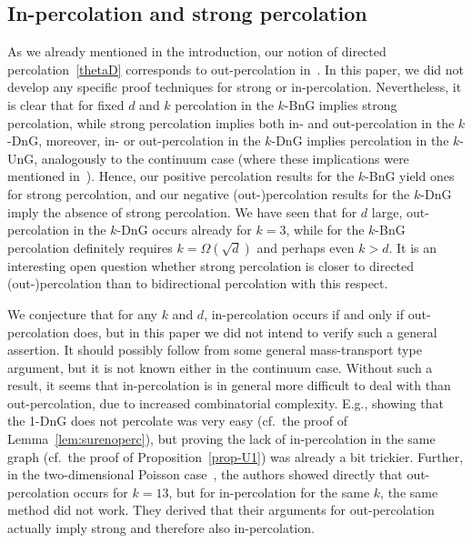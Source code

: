 \documentclass[oneside]{amsart}
\theoremstyle{definition}
\newcommand{\1}{\mathbbm{1}}
\newcommand{\0}{\mathbf{o}}
\numberwithin{equation}{section}
\begin{document}
\subsection{In-percolation and strong percolation}\label{sec-instrong}
As we already mentioned in the introduction, our notion of directed percolation~\eqref{thetaD} corresponds to out-percolation in~\cite{BalisterBollobas13}. In this paper, we did not develop any specific proof techniques for strong or in-percolation. Nevertheless, it is clear that for fixed $d$ and $k$ percolation in the $k$-BnG implies strong percolation, while strong percolation implies both in- and out-percolation in the $k$-DnG, moreover, in- or out-percolation in the $k$-DnG implies percolation in the $k$-UnG, analogously to the continuum case (where these implications were mentioned in~\cite{BalisterBollobas13}). Hence, our positive percolation results for the $k$-BnG yield ones for strong percolation, and our negative (out-)percolation results for the $k$-DnG imply the absence of strong percolation. We have seen that for $d$ large, out-percolation in the $k$-DnG occurs already for $k=3$, while for the $k$-BnG percolation definitely requires $k=\Omega(\sqrt d)$ and perhaps even $k>d$. It is an interesting open question whether strong percolation is closer to directed (out-)percolation than to bidirectional percolation with this respect.

We conjecture that for any $k$ and $d$, in-percolation occurs if and only if out-percolation does, but in this paper we did not intend to verify such a general assertion. It should possibly follow from some general mass-transport type argument, but it is not known either in the continuum case. Without such a result, it seems that in-percolation is in general more difficult to deal with than out-percolation, due to increased combinatorial complexity. E.g., showing that the 1-DnG does not percolate was very easy (cf.\ the proof of Lemma~\ref{lem:surenoperc}), but proving the lack of in-percolation in the same graph (cf.\ the proof of Proposition~\ref{prop-U1}) was already a bit trickier. Further, in the two-dimensional Poisson case~\cite[Proof of Theorem 2]{BalisterBollobas13}, the authors showed directly that 
out-percolation occurs for $k=13$, but for in-percolation for the same $k$, the same method did not work. They derived that their arguments for out-percolation actually imply strong and therefore also in-percolation.

\appendix
\end{document}
